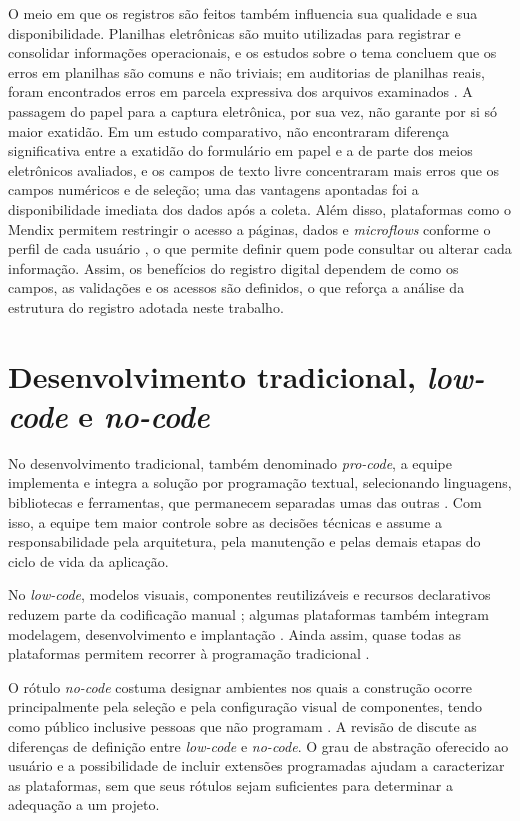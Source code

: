 O meio em que os registros são feitos também influencia sua qualidade e sua disponibilidade. Planilhas eletrônicas são muito utilizadas para registrar e consolidar informações operacionais, e os estudos sobre o tema concluem que os erros em planilhas são comuns e não triviais; em auditorias de planilhas reais, foram encontrados erros em parcela expressiva dos arquivos examinados \cite[p.~1--2]{panko2000}. A passagem do papel para a captura eletrônica, por sua vez, não garante por si só maior exatidão. Em um estudo comparativo,  não encontraram diferença significativa entre a exatidão do formulário em papel e a de parte dos meios eletrônicos avaliados, e os campos de texto livre concentraram mais erros que os campos numéricos e de seleção; uma das vantagens apontadas foi a disponibilidade imediata dos dados após a coleta. Além disso, plataformas como o Mendix permitem restringir o acesso a páginas, dados e \textit{microflows} conforme o perfil de cada usuário \cite{mendix2026security}, o que permite definir quem pode consultar ou alterar cada informação. Assim, os benefícios do registro digital dependem de como os campos, as validações e os acessos são definidos, o que reforça a análise da estrutura do registro adotada neste trabalho.

\section{Desenvolvimento tradicional, \textit{low-code} e \textit{no-code}}

No desenvolvimento tradicional, também denominado \textit{pro-code}, a equipe implementa e integra a solução por programação textual, selecionando linguagens, bibliotecas e ferramentas, que permanecem separadas umas das outras \cite[p.~737]{bockfrank2021}. Com isso, a equipe tem maior controle sobre as decisões técnicas e assume a responsabilidade pela arquitetura, pela manutenção e pelas demais etapas do ciclo de vida da aplicação.

No \textit{low-code}, modelos visuais, componentes reutilizáveis e recursos declarativos reduzem parte da codificação manual \cite[p.~171--173]{sahay2020}; algumas plataformas também integram modelagem, desenvolvimento e implantação \cite[p.~735--737]{bockfrank2021}. Ainda assim, quase todas as plataformas permitem recorrer à programação tradicional \cite[p.~736]{bockfrank2021}.

O rótulo \textit{no-code} costuma designar ambientes nos quais a construção ocorre principalmente pela seleção e pela configuração visual de componentes, tendo como público inclusive pessoas que não programam \cite[seç.~6.2]{abendroth2026}. A revisão de  discute as diferenças de definição entre \textit{low-code} e \textit{no-code}. O grau de abstração oferecido ao usuário e a possibilidade de incluir extensões programadas ajudam a caracterizar as plataformas, sem que seus rótulos sejam suficientes para determinar a adequação a um projeto.

